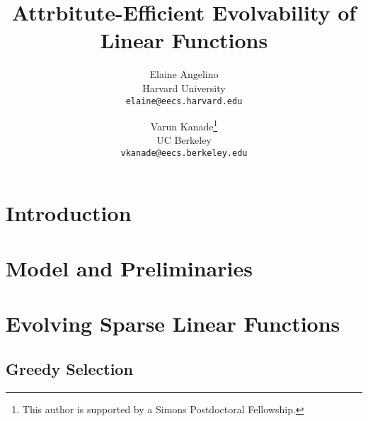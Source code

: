 \documentclass[11pt]{article}
\begin{document}
\title{Attrbitute-Efficient Evolvability of Linear Functions} 
\author{Elaine Angelino \\
Harvard University \\ \texttt{elaine@eecs.harvard.edu} \and Varun
Kanade\thanks{This author is supported by a Simons Postdoctoral Fellowship.} \\
UC Berkeley \\ \texttt{vkanade@eecs.berkeley.edu}}

\maketitle

\begin{abstract}

\end{abstract}

\newpage

\section{Introduction}
\label{sec:introduction}


\section{Model and Preliminaries}
\label{sec:notation}


\section{Evolving Sparse Linear Functions}
\label{sec:algorithms}


\subsection{Greedy Selection}
\label{sec:greedy}


% 
% 
% 
\end{document}
